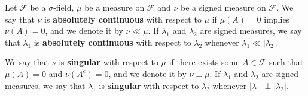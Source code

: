 \begin{defn} Let \(\mathcal{F}\) be a \(\sigma\)-field, \(\mu\) be a measure on \(\mathcal{F}\)  and \(\nu\) be a signed
measure on \(\mathcal{F}\). We say that \(\nu\) is \textbf{absolutely continuous} with
respect to \(\mu\) if \(\mu(A)=0\) implies \(\nu(A)=0\), and we denote it by
\(\nu\ll\mu\). If \(\lambda_{1}\) and \(\lambda_{2}\) are signed measures, we
say that \(\lambda_{1}\) is \textbf{absolutely continuous} with respect to
\(\lambda_{2}\) whenever
\(\lambda_{1}\ll\left|\lambda_{2}\right|\).
	
We say that \(\nu\) is \textbf{singular} with respect to \(\mu\) if there
exists some \(A\in\mathcal{F}\) such that \(\mu(A)=0\) and \(\nu(A^c)=0\), and we denote
it by \(\nu\perp\mu\). If \(\lambda_{1}\) and \(\lambda_{2}\) are signed
measures, we say that \(\lambda_{1}\) is \textbf{singular} with respect to
\(\lambda_{2}\) whenever
\(\left|\lambda_{1}\right|\perp\left|\lambda_{2}\right|\).
\end{defn}


